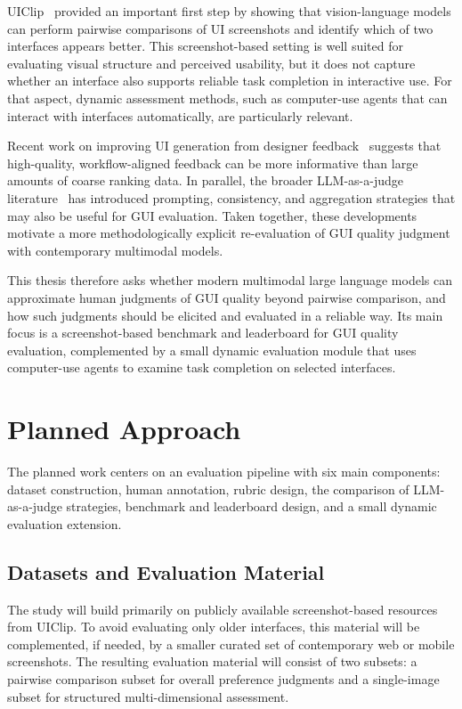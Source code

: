 \documentclass[pdflatex,sn-mathphys-num]{sn-jnl}
\begin{document}
UIClip~\cite{uiclip} provided an important first step by showing that vision-language
models can perform pairwise comparisons of UI screenshots and identify which of two
interfaces appears better. This screenshot-based setting is well suited for evaluating
visual structure and perceived usability, but it does not capture whether an interface
also supports reliable task completion in interactive use. For that aspect, dynamic
assessment methods, such as computer-use agents that can interact with interfaces
automatically, are particularly relevant.

Recent work on improving UI generation from designer feedback~\cite{designer_feedback}
suggests that high-quality, workflow-aligned feedback can be more informative than
large amounts of coarse ranking data. In parallel, the broader LLM-as-a-judge
literature~\cite{llm_judge} has introduced prompting, consistency, and aggregation
strategies that may also be useful for GUI evaluation. Taken together, these
developments motivate a more methodologically explicit re-evaluation of GUI quality
judgment with contemporary multimodal models.

This thesis therefore asks whether modern multimodal large language models can
approximate human judgments of GUI quality beyond pairwise comparison, and how such
judgments should be elicited and evaluated in a reliable way. Its main focus is a
screenshot-based benchmark and leaderboard for GUI quality evaluation, complemented by
a small dynamic evaluation module that uses computer-use agents to examine task
completion on selected interfaces.

\section{Planned Approach}\label{sec:approach}

The planned work centers on an evaluation pipeline with six main components: dataset
construction, human annotation, rubric design, the comparison of LLM-as-a-judge
strategies, benchmark and leaderboard design, and a small dynamic evaluation
extension.

\subsection{Datasets and Evaluation Material}

The study will build primarily on publicly available screenshot-based resources from
UIClip. To avoid evaluating only older interfaces, this material will be complemented,
if needed, by a smaller curated set of contemporary web or mobile screenshots. The
resulting evaluation material will consist of two subsets: a pairwise comparison subset
for overall preference judgments and a single-image subset for structured
multi-dimensional assessment.
\end{document}
